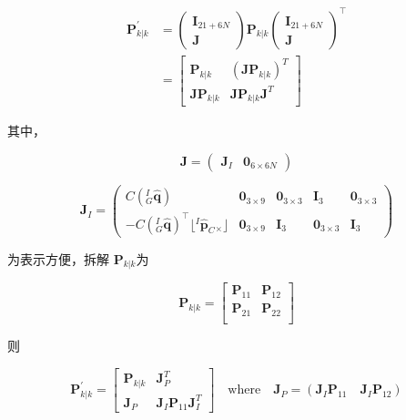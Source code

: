 \documentclass[12pt,a4paper]{article}
\begin{document}
\begin{equation}
\begin{aligned}
\mathbf{P}_{k|k}^{\prime}
&= 
\begin{pmatrix}
\mathbf{I}_{21+6N} \\ \mathbf{J}
\end{pmatrix}
\mathbf{P}_{k|k}
\begin{pmatrix}
\mathbf{I}_{21+6N} \\ \mathbf{J}
\end{pmatrix}^\top \\
&=
\begin{bmatrix}
\mathbf{P}_{k|k} & (\mathbf{J} \mathbf{P}_{k|k})^T \\
\mathbf{J} \mathbf{P}_{k|k} & \mathbf{J} \mathbf{P}_{k|k} \mathbf{J}^T
\end{bmatrix}
\end{aligned}
\end{equation}

其中，

\begin{equation*}
\mathbf{J} = 
\begin{pmatrix}
\mathbf{J}_I & \mathbf{0}_{6\times 6N}
\end{pmatrix}
\end{equation*}

\begin{equation*}
\mathbf{J}_I = 
\begin{pmatrix}
C\left({}^I_G\hat{\mathbf{q}}\right) & \mathbf{0}_{3\times 9} & 
\mathbf{0}_{3\times 3} & \mathbf{I}_3 & \mathbf{0}_{3\times 3} \\
-C\left({}^I_G\hat{\mathbf{q}}\right)^\top \lfloor{}^I\hat{\mathbf{p}}_C {}_{\times}\rfloor & 
\mathbf{0}_{3\times 9} & \mathbf{I}_3 & \mathbf{0}_{3\times 3} & 
\mathbf{I}_{3}
\end{pmatrix}
\end{equation*}

为表示方便，拆解 $\mathbf{P}_{k|k}$为

\begin{equation}
\mathbf{P}_{k|k} =
\begin{bmatrix}
\mathbf{P}_{11} & \mathbf{P}_{12} \\
\mathbf{P}_{21} & \mathbf{P}_{22} \\
\end{bmatrix}
\end{equation}

则

\begin{equation}
\mathbf{P}_{k|k}^{\prime} =
\begin{bmatrix}
\mathbf{P}_{k|k} & \mathbf{J}_P^T \\
\mathbf{J}_P & \mathbf{J}_I \mathbf{P}_{11} \mathbf{J}_I^T
\end{bmatrix}
\quad \text{where} \quad
\mathbf{J}_P = \left(\mathbf{J}_I \mathbf{P}_{11} \quad \mathbf{J}_I \mathbf{P}_{12}\right)
\end{equation}
\end{document}
